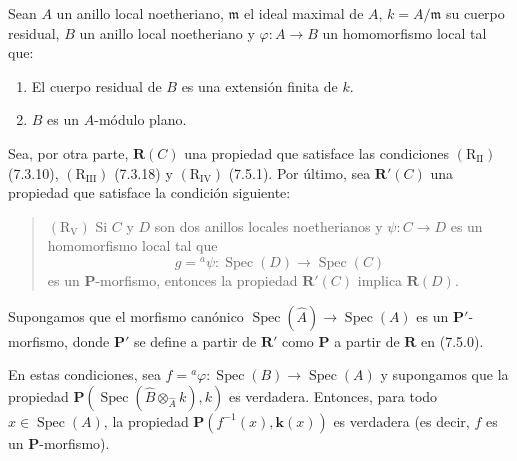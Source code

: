 \begin{corollary}[7.5.2]
\label{IV.2.s7.5.2-fr}
Sean $A$ un anillo local noetheriano, $\mathfrak m$ el ideal maximal de $A$,
$k=A/\mathfrak m$ su cuerpo residual, $B$ un anillo local noetheriano
y $\varphi:A\to B$ un homomorfismo local tal que:
\begin{enumerate}
\item[\emph{(i)}] El cuerpo residual de $B$ es una extensión finita de $k$.
\item[\emph{(ii)}] $B$ es un $A$-módulo plano.
\end{enumerate}
Sea, por otra parte, $\boldsymbol R(C)$ una propiedad que satisface las
condiciones $(\mathrm R_{\mathrm{II}})$ \textup{(7.3.10)},
$(\mathrm R_{\mathrm{III}})$ \textup{(7.3.18)} y $(\mathrm R_{\mathrm{IV}})$
\textup{(7.5.1)}. Por último, sea $\boldsymbol R'(C)$ una propiedad que satisface
la condición siguiente:
\begin{quote}
$(\mathrm R_{\mathrm V})$ Si $C$ y $D$ son dos anillos locales
noetherianos y $\psi:C\to D$ es un homomorfismo local tal que
\[
g={}^a\psi:\operatorname{Spec}(D)\to\operatorname{Spec}(C)
\]
es un $\boldsymbol P$-morfismo, entonces la propiedad
$\boldsymbol R'(C)$ implica $\boldsymbol R(D)$.
\end{quote}
Supongamos que el morfismo canónico
$\operatorname{Spec}(\widehat A)\to\operatorname{Spec}(A)$ es un
$\boldsymbol P'$-morfismo, donde $\boldsymbol P'$ se define a partir
de $\boldsymbol R'$ como $\boldsymbol P$ a partir de $\boldsymbol R$
en \textup{(7.5.0)}.

En estas condiciones, sea
$f={}^a\varphi:\operatorname{Spec}(B)\to\operatorname{Spec}(A)$ y
supongamos que la propiedad
$\boldsymbol P(\operatorname{Spec}(\widehat B
\otimes_{\widehat A}k),k)$
es verdadera. Entonces, para todo $x\in\operatorname{Spec}(A)$, la propiedad
$\boldsymbol P(f^{-1}(x),\boldsymbol{k}(x))$ es verdadera \textup{(es decir,} $f$ \textup{es un}
$\boldsymbol P$-morfismo).
\end{corollary}

